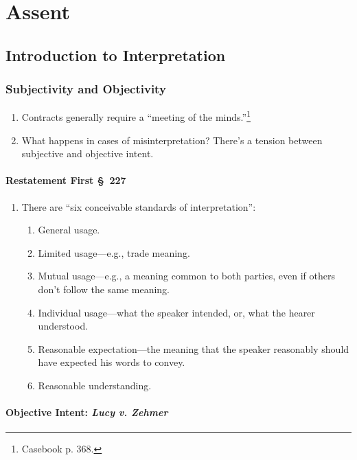 \section{Assent}

\subsection{Introduction to Interpretation}

\subsubsection{Subjectivity and Objectivity}

\begin{enumerate}
    \item Contracts generally require a ``meeting of the 
    minds.''\footnote{Casebook p. 368.}
    \item What happens in cases of misinterpretation? There's a tension 
    between subjective and objective intent.
\end{enumerate}

\paragraph{Restatement First \S\ 227}

\begin{enumerate}
    \item There are ``six conceivable standards of interpretation'':
    \begin{enumerate}
        \item General usage.
        \item Limited usage---e.g., trade meaning.
        \item Mutual usage---e.g., a meaning common to both parties, even 
        if others don't follow the same meaning.
        \item Individual usage---what the speaker intended, or, what the 
        hearer understood.
        \item Reasonable expectation---the meaning that the speaker reasonably 
        should have expected his words to convey.
        \item Reasonable understanding.
    \end{enumerate}
\end{enumerate}

\paragraph{Objective Intent: \emph{Lucy v. Zehmer}}


